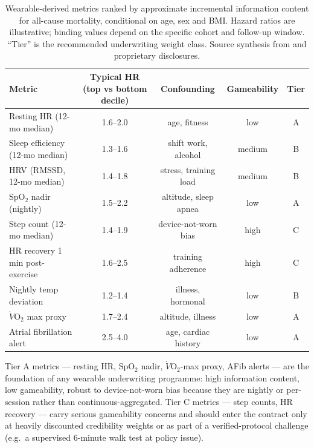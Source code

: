 \begin{table}[ht]
\centering\small
\caption{Wearable-derived metrics ranked by approximate incremental
information content for all-cause mortality, conditional on age, sex
and BMI. Hazard ratios are illustrative; binding values depend on the
specific cohort and follow-up window. ``Tier'' is the recommended
underwriting weight class. Source synthesis from
\cite{Strain2020,Hippisley2017,Biobank2024} and proprietary
disclosures.}\label{tab:signals}
\setlength{\tabcolsep}{5pt}
\begin{tabular}{p{3.6cm}cccc}
\toprule
Metric & Typical HR (top vs bottom decile) & Confounding & Gameability & Tier \\
\midrule
Resting HR (12-mo median)        & 1.6--2.0 & age, fitness           & low    & A \\
Sleep efficiency (12-mo median)  & 1.3--1.6 & shift work, alcohol   & medium & B \\
HRV (RMSSD, 12-mo median)        & 1.4--1.8 & stress, training load & medium & B \\
SpO$_2$ nadir (nightly)          & 1.5--2.2 & altitude, sleep apnea & low    & A \\
Step count (12-mo median)        & 1.4--1.9 & device-not-worn bias  & high   & C \\
HR recovery 1\,min post-exercise & 1.6--2.5 & training adherence    & high   & C \\
Nightly temp deviation           & 1.2--1.4 & illness, hormonal     & low    & B \\
$\dot{V}\mathrm{O}_2$ max proxy  & 1.7--2.4 & altitude, illness    & low    & A \\
Atrial fibrillation alert        & 2.5--4.0 & age, cardiac history  & low    & A \\
\bottomrule
\end{tabular}
\end{table}

Tier A metrics --- resting HR, SpO$_2$ nadir, $\dot{V}\mathrm{O}_2$-max
proxy, AFib alerts --- are the foundation of any wearable underwriting
programme: high information content, low gameability, robust to
device-not-worn bias because they are nightly or per-session rather
than continuous-aggregated. Tier C metrics --- step counts, HR
recovery --- carry serious gameability concerns and should enter the
contract only at heavily discounted credibility weights or as part of
a verified-protocol challenge (e.g.\ a supervised 6-minute walk test
at policy issue).

